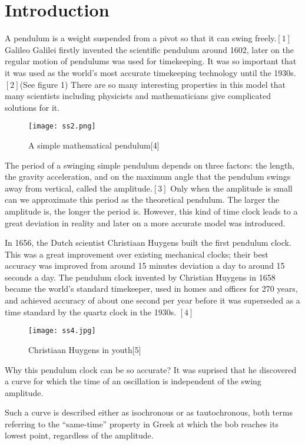 \documentclass{article}
\begin{document}
\section{Introduction}
	\par A pendulum is a weight suspended from a pivot so that it can swing freely.${[1]}$ Galileo Galilei firstly invented the scientific pendulum around 1602, later on the regular motion of pendulums was used for timekeeping. It was so important that it was used as the world's most accurate timekeeping technology until the 1930s.${[2]}$(See figure 1) There are so many interesting properties in this model that many scientists including physicists and mathematicians give complicated solutions for it.
 \begin{figure}[H]
 \small
 \centering
 \texttt{[image: ss2.png]}
 \caption{A simple mathematical pendulum[4]}
 \end{figure}
   \par The period of a swinging simple pendulum depends on three factors: the length, the gravity acceleration, and on the maximum angle that the pendulum swings away from vertical, called the amplitude.${[3]}$ Only when the amplitude is small can we approximate this period as the theoretical pendulum. The larger the amplitude is, the longer the period is. However, this kind of time clock leads to a great deviation in reality and later on a more accurate model was introduced.
  \par In 1656, the Dutch scientist Christiaan Huygens built the first pendulum clock. This was a great improvement over existing mechanical clocks; their best accuracy was improved from around 15 minutes deviation a day to around 15 seconds a day. The pendulum clock invented by Christian Huygens in 1658 became the world's standard timekeeper, used in homes and offices for 270 years, and achieved accuracy of about one second per year before it was superseded as a time standard by the quartz clock in the 1930s. ${[4]}$
   \begin{figure}[H]
 \small
 \centering
 \texttt{[image: ss4.jpg]}
 \caption{Christiaan Huygens in youth[5]}
 \end{figure}
 \par Why this pendulum clock can be so accurate? It was suprised that he discovered a curve for which the time of an oscillation is independent of the swing amplitude.
\par  Such a curve is described either as isochronous or as tautochronous, both terms referring to the ``same-time'' property in Greek at which the bob reaches its lowest point, regardless of the amplitude.
\end{document}
